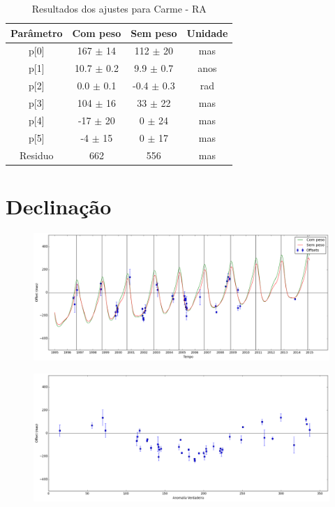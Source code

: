 \documentclass[11pt,a4paper]{report}
\begin{document}
\begin{table}[h!]
\caption{\label{Tab: Carme-RA} Resultados dos ajustes para Carme - RA}
\begin{centering}
\begin{tabular}{cccc}
\hline
\hline
Parâmetro & Com peso & Sem peso & Unidade\tabularnewline
\hline
p[0] & 167 $\pm$ 14 & 112 $\pm$ 20 & mas\\
p[1] & 10.7 $\pm$ 0.2 & 9.9 $\pm$ 0.7 & anos\\
p[2] & 0.0 $\pm$ 0.1 & -0.4 $\pm$ 0.3 & rad\\
p[3] & 104 $\pm$ 16 & 33 $\pm$ 22 & mas\\
p[4] & -17 $\pm$ 20 & 0 $\pm$ 24 & mas\\
p[5] & -4 $\pm$ 15 & 0 $\pm$ 17 & mas\\
Residuo & 662 & 556 & mas\\
\hline 
\end{tabular} 
\par\end{centering}
\end{table}

\section*{Declinação}

\begin{figure}[h]
\includegraphics[scale=0.35]{Carme/DEC.png} 
\end{figure}

\begin{figure}[h]
\includegraphics[scale=0.35]{Carme/DEC_anom.png}  
\end{figure}
\end{document}
